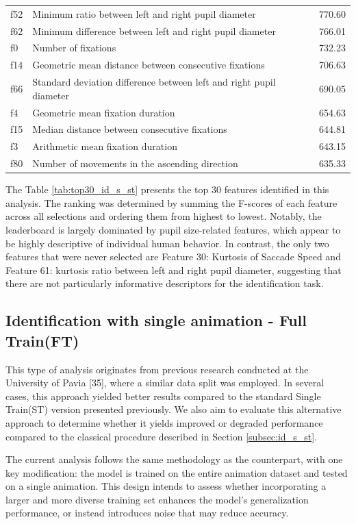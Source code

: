 \documentclass[12pt]{report}
\begin{document}
\begin{table}[htbp]
\begin{tabular}{lll}
f52 & Minimum ratio between left and right pupil diameter & 770.60 \\
f62 & Minimum difference between left and right pupil diameter & 766.01 \\
f0 & Number of fixations & 732.23 \\
f14 & Geometric mean distance between consecutive fixations & 706.63 \\
f66 & Standard deviation difference between left and right pupil diameter & 690.05 \\
f4 & Geometric mean fixation duration & 654.63 \\
f15 & Median distance between consecutive fixations & 644.81 \\
f3 & Arithmetic mean fixation duration & 643.15 \\
f80 & Number of movements in the ascending direction & 635.33 \\
\bottomrule
\end{tabular}
\end{table}

The Table \ref{tab:top30_id_s_st} presents the top 30 features identified in this analysis.
The ranking was determined by summing the F-scores of each feature across all selections and ordering them from highest to lowest.
Notably, the leaderboard is largely dominated by pupil size-related features, which appear to be highly descriptive of individual human behavior.
In contrast, the only two features that were never selected are Feature 30: Kurtosis of Saccade Speed and Feature 61: kurtosis ratio between left and right pupil diameter, suggesting that there are not particularly informative descriptors for the identification task.
\FloatBarrier

\subsection{Identification with single animation - Full Train(FT)}
\label{subsec:id_s_ft}

This type of analysis originates from previous research conducted at the University of Pavia [35], where a similar data split was employed. 
In several cases, this approach yielded better results compared to the standard Single Train(ST) version presented previously.
We also aim to evaluate this alternative approach to determine whether it yields improved or degraded performance compared to the classical procedure described in Section \ref{subsec:id_s_st}. 

The current analysis follows the same methodology as the counterpart, with one key modification: the model is trained on the entire animation dataset and tested on a single animation. 
This design intends to assess whether incorporating a larger and more diverse training set enhances the model's generalization performance, or instead introduces noise that may reduce accuracy.
\end{document}
